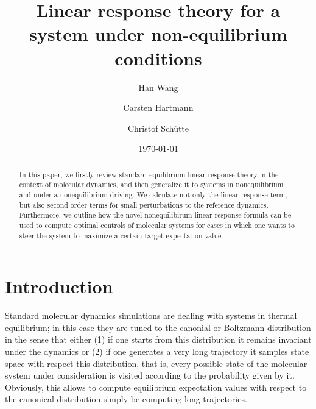 \documentclass[aip,jcp,a4paper,reprint,onecolumn]{revtex4-1}
\begin{document}
\title{Linear response theory for a system under non-equilibrium conditions}
\author{Han Wang}
\author{Carsten Hartmann}
\author{Christof Sch\"utte}

\date{\today}

\begin{abstract}
  In this paper, we firstly review standard equilibrium linear response
  theory in the context of molecular dynamics, and then generalize it to systems in nonequilibrium and under a nonequilibrium
  driving. We calculate not only the linear response term, but also
  second order terms for small perturbations to the reference dynamics. Furthermore, we outline how the novel nonequilibirum linear response formula can be used to compute optimal controls of molecular systems for cases in which one wants to steer the system to maximize a certain target expectation value.

\end{abstract}

\maketitle

\section{Introduction}

Standard molecular dynamics simulations are dealing with systems in thermal equilibrium; in this case they are tuned to the canonial or Boltzmann distribution in the sense that either (1) if one starts from this distribution it remains invariant under the dynamics or (2) if one generates a very long trajectory it samples state space with respect this distribution, that is, every possible state of the molecular system under consideration is visited according to the probability given by it.  Obviously, this allows to compute equilibrium expectation values with respect to the  canonical distribution simply be computing long trajectories. 
\end{document}
